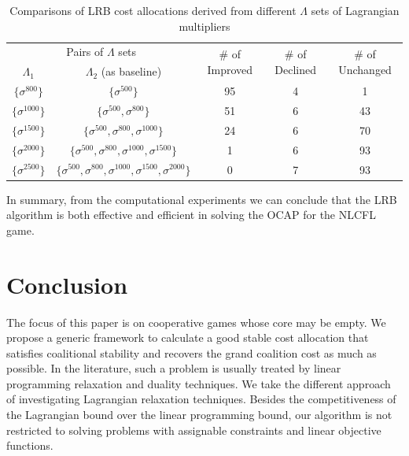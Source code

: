 \documentclass[ijoc,nonblindrev]{informs3} %
\begin{document}
\begin{table}[H]
\vspace{-2mm}
\centering
\tabcolsep=9pt
\small
\renewcommand\arraystretch{1.5}
\caption{\label{table:CFLIterations}
Comparisons of LRB cost allocations derived from different $\Lambda$ sets of Lagrangian multipliers}
\begin{tabular}[!h]{c c c c c}
\hline
\multicolumn{2}{c}{Pairs of $\Lambda$ sets} &\multirow{2}{*}{\# of Improved}	&\multirow{2}{*}{\# of Declined}	&\multirow{2}{*}{\# of Unchanged}\\
\cline{1-2}
$\Lambda_1$ &$\Lambda_2$ (as baseline) &\\
\hline
$\big\{\sigma^{800}\big\}$  &$\big\{\sigma^{500}\big\}$   &95	&4	&1\\

$\big\{\sigma^{1000}\big\}$ &$\big\{\sigma^{500}, \sigma^{800}\big\}$     &51	&6	&43\\

$\big\{\sigma^{1500}\big\}$ &$\big\{\sigma^{500},\sigma^{800},\sigma^{1000}\big\}$     &24	&6	&70\\

$\big\{\sigma^{2000}\big\}$ &$\big\{\sigma^{500},\sigma^{800},\sigma^{1000},\sigma^{1500}\big\}$     &1	&6	&93\\

$\big\{\sigma^{2500}\big\}$ &$\big\{\sigma^{500},\sigma^{800},\sigma^{1000},\sigma^{1500},\sigma^{2000}\big\}$     &0	&7	&93\\
\hline
\end{tabular}
\vspace{-5mm}
\end{table}

In summary, from the computational experiments  we can conclude that the LRB algorithm is both effective and efficient in solving the OCAP for the NLCFL game.




\section{Conclusion}\label{sec:conclude}

The focus of this paper is on cooperative games whose core may be empty. We propose a generic framework to calculate a good stable cost allocation that satisfies coalitional stability and recovers the grand coalition cost as much as possible. In the literature, such a problem is usually treated by linear programming relaxation and duality techniques.
We take the different approach of investigating Lagrangian relaxation techniques.
Besides the competitiveness of the Lagrangian bound over the linear programming bound, our algorithm is not restricted to solving problems with assignable constraints and linear objective functions.
\end{document}
